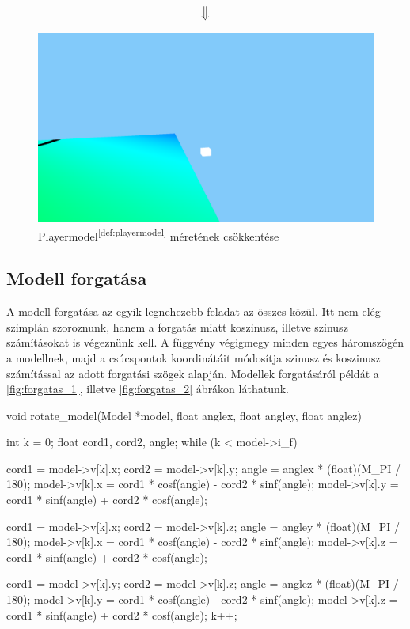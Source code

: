 	$$\big\Downarrow$$
	
	
\begin{figure}[h]
		\centering
		\includegraphics[width=13truecm, height=7truecm]{images/modell_4.3.1.3.png}
		\caption{Playermodel\textsuperscript{\ref{def:playermodel}} méretének csökkentése}
		\label{fig:meret_2}
\end{figure}

	



\newpage
\subsection{Modell forgatása}
A modell forgatása az egyik legnehezebb feladat az összes közül. Itt nem elég szimplán szoroznunk, hanem a forgatás miatt koszinusz, illetve szinusz számításokat is végeznünk kell. A függvény végigmegy minden egyes háromszögén a modellnek, majd a csúcspontok koordinátáit módosítja szinusz és koszinusz számítással az adott forgatási szögek alapján. Modellek forgatásáról példát a \ref{fig:forgatas_1}, illetve \ref{fig:forgatas_2} ábrákon láthatunk.
\begin{cpp}
void rotate_model(Model *model, float anglex, float angley, float anglez)
{
    int k = 0;
    float cord1, cord2, angle;
    while (k < model->i_f)
    {
        cord1 = model->v[k].x;
        cord2 = model->v[k].y;
        angle = anglex * (float)(M_PI / 180);
        model->v[k].x = cord1 * cosf(angle) - cord2 * sinf(angle);
        model->v[k].y = cord1 * sinf(angle) + cord2 * cosf(angle);
			
        cord1 = model->v[k].x;
        cord2 = model->v[k].z;
        angle = angley * (float)(M_PI / 180);
        model->v[k].x = cord1 * cosf(angle) - cord2 * sinf(angle);
        model->v[k].z = cord1 * sinf(angle) + cord2 * cosf(angle);
			
        cord1 = model->v[k].y;
        cord2 = model->v[k].z;
        angle = anglez * (float)(M_PI / 180);
        model->v[k].y = cord1 * cosf(angle) - cord2 * sinf(angle);
        model->v[k].z = cord1 * sinf(angle) + cord2 * cosf(angle);
        k++;
    }
}
\end{cpp}



